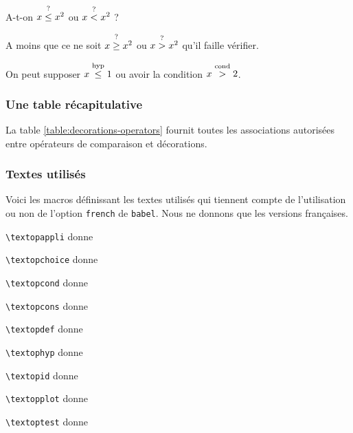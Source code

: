 \documentclass[12pt,a4paper]{article}
\begin{document}
\begin{tcblisting}{}
A-t-on $x \leqtest x^2$ ou $x \ltest x^2$ ?

A moins que ce ne soit $x \geqtest x^2$ ou $x \gtest x^2$ qu'il faille vérifier.

On peut supposer $x \leqhyp 1$ ou avoir la condition $x \gcond 2$.

\end{tcblisting}



\subsubsection{Une table récapitulative}

La table \ref{table:decorations-operators}  fournit toutes les associations autorisées entre opérateurs de comparaison et décorations.



\subsubsection{Textes utilisés} \label{text-for-opes}

Voici les macros définissant les textes utilisés qui tiennent compte de l'utilisation ou non de l'option \verb+french+ de \verb+babel+. Nous ne donnons que les versions françaises.


\begin{multicols}{2}
    \verb+\textopappli+ donne \emph{\og \textopappli \fg}

    \verb+\textopchoice+ donne \emph{\og \textopchoice \fg}

    \verb+\textopcond+ donne \emph{\og \textopcond \fg}

    \verb+\textopcons+ donne \emph{\og \textopcons \fg}

    \verb+\textopdef+ donne \emph{\og \textopdef \fg}

    \verb+\textophyp+ donne \emph{\og \textophyp \fg}

    \verb+\textopid+ donne \emph{\og \textopid \fg}

    \verb+\textopplot+ donne \emph{\og \textopplot \fg}

    \verb+\textoptest+ donne \emph{\og \textoptest \fg}
\vfill\null\end{multicols}

\end{document}
